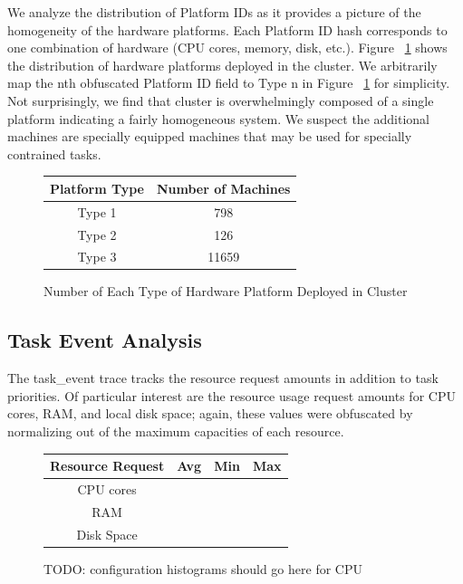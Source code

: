\documentclass{sig-alternate}
\begin{document}
We analyze the distribution of Platform IDs as it provides a picture of the homogeneity of the hardware platforms.
Each Platform ID hash corresponds to one combination of hardware (CPU cores, memory, disk, etc.).
Figure ~\ref{platform_dist} shows the distribution of hardware platforms deployed in the cluster.
We arbitrarily map the nth obfuscated Platform ID field to Type n in Figure ~\ref{platform_dist} for simplicity.
Not surprisingly, we find that cluster is overwhelmingly composed of a single platform indicating a fairly homogeneous system.
We suspect the additional machines are specially equipped machines that may be used for specially contrained tasks.

\begin{figure}
\centering
\begin{tabular}{| c | c |} \hline
Platform Type & Number of Machines\\ \hline
Type 1 & 798\\ \hline
Type 2 & 126\\ \hline
Type 3 & 11659 \\ \hline
\end{tabular}
\label{platform_dist}
\caption{Number of Each Type of Hardware Platform Deployed in Cluster}
\end{figure}

\subsection{Task Event Analysis}

The task\_event trace tracks the resource request amounts in addition to task priorities.
Of particular interest are the resource usage request amounts for CPU cores, RAM, and local disk space; again, these values were obfuscated by normalizing out of the maximum capacities of each resource.

\begin{figure}
\centering
\begin{tabular}{| c | c | c | c |} \hline
Resource Request & Avg & Min & Max \\ \hline
CPU cores & & & \\ \hline
RAM & & & \\ \hline
Disk Space & & & \\ \hline
\end{tabular}
\label{resource_summary}
\end{figure}

\begin{figure}
TODO: configuration histograms should go here for CPU
\end{figure}
\end{document}
